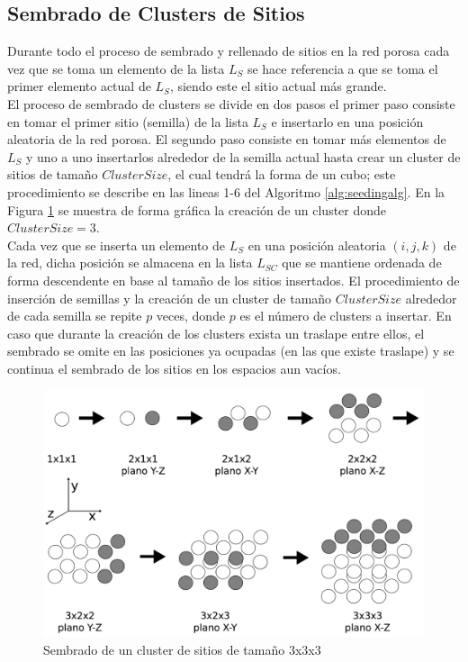 \subsection{Sembrado de Clusters de Sitios}
\label{subsec:sseeding}
Durante todo el proceso de sembrado y rellenado de sitios en la red porosa cada vez que se toma un elemento de la lista $L_S$ 
se hace referencia a que se toma el primer elemento actual de $L_S$, siendo este el sitio actual más grande.\\
El proceso de sembrado de clusters se divide en dos pasos el primer paso consiste en tomar el primer sitio (semilla) de la lista $L_S$ e 
insertarlo en una posición aleatoria de la red porosa. El segundo paso consiste en tomar más elementos de $L_S$ y uno a uno insertarlos 
alrededor de la semilla actual hasta crear un cluster de sitios de tamaño $ClusterSize$, el cual tendrá la forma de un cubo; este 
procedimiento se describe en las lineas 1-6 del Algoritmo \ref{alg:seedingalg}. En la Figura \ref{fig:cluster} se muestra de forma 
gráfica la creación de un cluster donde $ClusterSize=3$.\\

Cada vez que se inserta un elemento de $L_S$ en una posición aleatoria $(i,j,k)$ de la red, dicha posición se almacena en 
la lista $L_{SC}$ que se mantiene ordenada de forma descendente en base al tamaño de los sitios insertados. El procedimiento de 
inserción de semillas y la creación de un cluster de tamaño $ClusterSize$ alrededor de cada semilla se repite $p$ veces, donde $p$ 
es el n\'umero de clusters a insertar. En caso que durante la creación de los clusters exista un traslape entre ellos, el sembrado 
se omite en las posiciones ya ocupadas (en las que existe traslape) y se continua el sembrado de los sitios en los espacios aun vacíos.\\

\begin{figure}[hbtp]
\centering
\includegraphics[width=5.0in]{img/cluster_es.pdf}
\caption{Sembrado de un cluster de sitios de tamaño 3x3x3}
\label{fig:cluster}
\end{figure}

